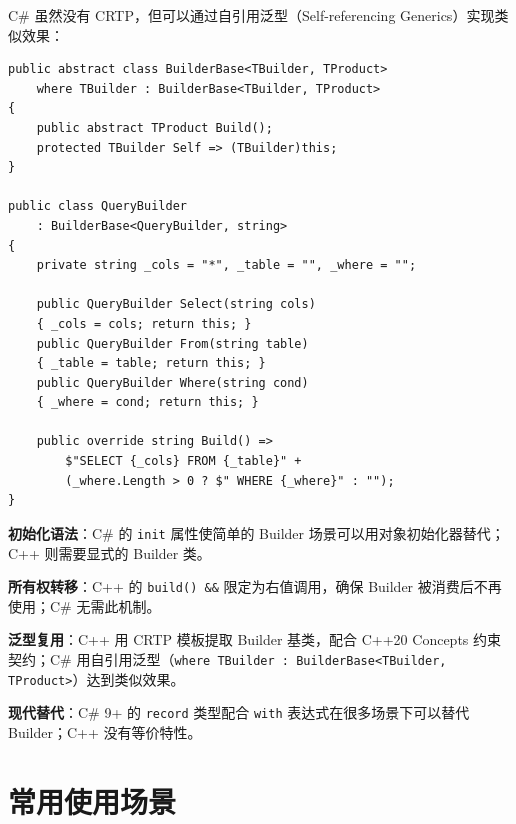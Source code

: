 \documentclass[12pt,a4paper,fontset=fandol]{ctexbook}
\begin{document}
C\# 虽然没有 CRTP，但可以通过自引用泛型（Self-referencing Generics）实现类似效果：

\begin{lstlisting}[style=csharpstyle, caption={C\# 泛型 Builder 基类}]
public abstract class BuilderBase<TBuilder, TProduct>
    where TBuilder : BuilderBase<TBuilder, TProduct>
{
    public abstract TProduct Build();
    protected TBuilder Self => (TBuilder)this;
}

public class QueryBuilder
    : BuilderBase<QueryBuilder, string>
{
    private string _cols = "*", _table = "", _where = "";

    public QueryBuilder Select(string cols)
    { _cols = cols; return this; }
    public QueryBuilder From(string table)
    { _table = table; return this; }
    public QueryBuilder Where(string cond)
    { _where = cond; return this; }

    public override string Build() =>
        $"SELECT {_cols} FROM {_table}" +
        (_where.Length > 0 ? $" WHERE {_where}" : "");
}
\end{lstlisting}

\begin{compare}
\textbf{初始化语法}：C\# 的 \texttt{init} 属性使简单的 Builder 场景可以用对象初始化器替代；C++ 则需要显式的 Builder 类。

\textbf{所有权转移}：C++ 的 \texttt{build() \&\&} 限定为右值调用，确保 Builder 被消费后不再使用；C\# 无需此机制。

\textbf{泛型复用}：C++ 用 CRTP 模板提取 Builder 基类，配合 C++20 Concepts 约束契约；C\# 用自引用泛型（\texttt{where TBuilder : BuilderBase<TBuilder, TProduct>}）达到类似效果。

\textbf{现代替代}：C\# 9+ 的 \texttt{record} 类型配合 \texttt{with} 表达式在很多场景下可以替代 Builder；C++ 没有等价特性。
\end{compare}

\section{常用使用场景}
\end{document}
